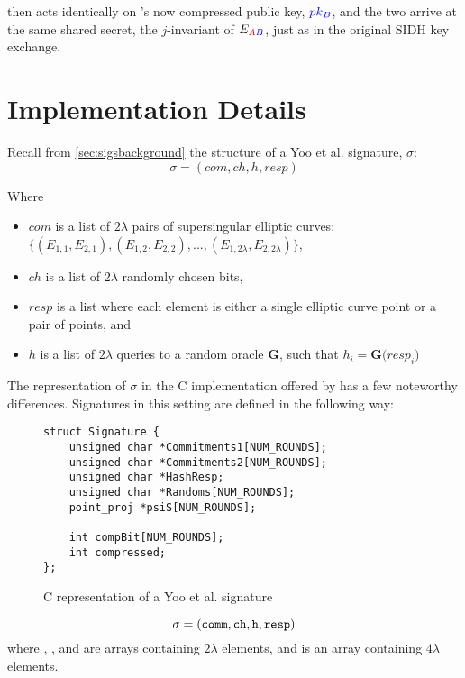 \alice then acts identically on \bob's now compressed public key, $\textcolor{blue}{pk_B}$, and the two arrive at the same shared secret, the $j$-invariant of $E_{\textcolor{red}{A}\textcolor{blue}{B}}$, just as in the original SIDH key exchange. 


\section{Implementation Details}
\label{sec:compimplementation}

Recall from \ref{sec:sigsbackground} the structure of a Yoo et al. signature, $\sigma$:
$$
\sigma = (com, ch, h, resp)
$$

\noindent
Where

\begin{itemize}
\item $com$ is a list of $2\lambda$ pairs of supersingular elliptic curves: $\{(E_{1,1}, E_{2,1}), (E_{1,2}, E_{2,2}), ..., (E_{1,2\lambda}, E_{2,2\lambda})\}$,
\item $ch$ is a list of $2\lambda$ randomly chosen bits,
\item $resp$ is a list where each element is either a single elliptic curve point or a pair of points, and
\item $h$ is a list of $2\lambda$ queries to a random oracle \textbf{G}, such that $h_{i} = \textbf{G(}resp_{i}\textbf{)}$
\end{itemize}

The representation of $\sigma$ in the C implementation offered by \cite{yoo} has a few noteworthy differences. Signatures in this setting are defined in the following way:
\begin{figure}[!h]
\begin{lstlisting}
struct Signature {
	unsigned char *Commitments1[NUM_ROUNDS];
	unsigned char *Commitments2[NUM_ROUNDS];
	unsigned char *HashResp;
	unsigned char *Randoms[NUM_ROUNDS];
	point_proj *psiS[NUM_ROUNDS];

	int compBit[NUM_ROUNDS];
	int compressed;
};
\end{lstlisting}
\caption{C representation of a Yoo et al. signature}
\label{code:sigstruct}
\end{figure}

$$
\sigma = (\texttt{comm}, \texttt{ch}, \texttt{h}, \texttt{resp})
$$
where , , and  are arrays containing $2\lambda$ elements, and  is an array containing $4\lambda$ elements. 


